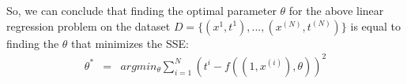 \documentclass{article} %
\begin{document}
So, we can conclude that finding the optimal parameter $\theta$ for the above linear regression problem on the dataset $D = \{  (x^{1},t^{1}), ... , (x^{(N)},t^{(N)})  \}$ is equal to finding the $\theta$ that minimizes the SSE:
\begin{equation}
    \begin{array}{rcl}
       \theta^* & = & argmin_\theta \sum\limits_{i=1}^{N}(  t^i - f((1,x^{(i)}), \theta) )^2
    \end{array}
\end{equation}








\end{document}
